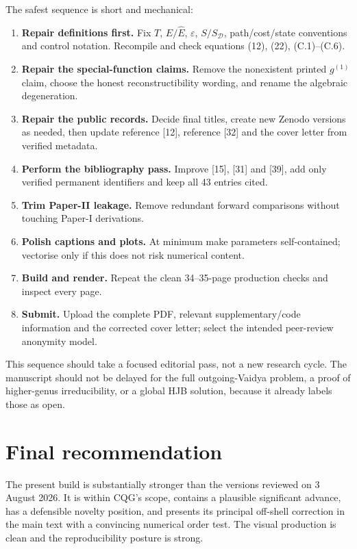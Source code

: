 \documentclass[11pt,a4paper]{article}
\newcommand{\Ehat}{\hat E}
\newcommand{\SD}{S_{\mathcal D}}
\begin{document}
The safest sequence is short and mechanical:

\begin{enumerate}
  \item \textbf{Repair definitions first.} Fix $T$, $E/\Ehat$, $\varepsilon$, $S/\SD$,
  path/cost/state conventions and control notation. Recompile and check equations (12), (22),
  (C.1)--(C.6).
  \item \textbf{Repair the special-function claims.} Remove the nonexistent printed $g^{(1)}$
  claim, choose the honest reconstructibility wording, and rename the algebraic degeneration.
  \item \textbf{Repair the public records.} Decide final titles, create new Zenodo versions as
  needed, then update reference [12], reference [32] and the cover letter from verified metadata.
  \item \textbf{Perform the bibliography pass.} Improve [15], [31] and [39], add only verified
  permanent identifiers and keep all 43 entries cited.
  \item \textbf{Trim Paper-II leakage.} Remove redundant forward comparisons without touching
  Paper-I derivations.
  \item \textbf{Polish captions and plots.} At minimum make parameters self-contained; vectorise
  only if this does not risk numerical content.
  \item \textbf{Build and render.} Repeat the clean 34--35-page production checks and inspect every
  page.
  \item \textbf{Submit.} Upload the complete PDF, relevant supplementary/code information and the
  corrected cover letter; select the intended peer-review anonymity model.
\end{enumerate}

This sequence should take a focused editorial pass, not a new research cycle. The manuscript
should not be delayed for the full outgoing-Vaidya problem, a proof of higher-genus
irreducibility, or a global HJB solution, because it already labels those as open.

\clearpage
\section{Final recommendation}

The present build is substantially stronger than the versions reviewed on 3 August 2026. It is
within CQG's scope, contains a plausible significant advance, has a defensible novelty position,
and presents its principal off-shell correction in the main text with a convincing numerical
order test. The visual production is clean and the reproducibility posture is strong.
\end{document}
